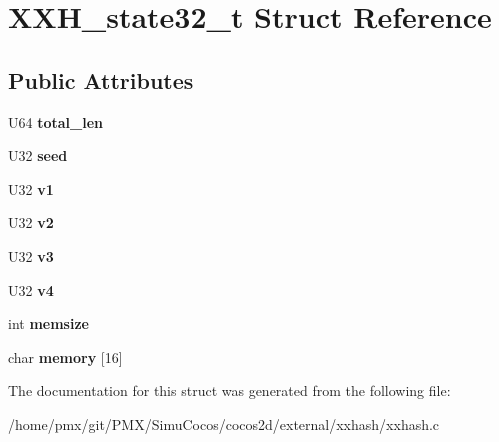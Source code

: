 \hypertarget{structXXH__state32__t}{}\section{X\+X\+H\+\_\+state32\+\_\+t Struct Reference}
\label{structXXH__state32__t}
\subsection*{Public Attributes}
\begin{DoxyCompactItemize}
\item 
\mbox{\label{structXXH__state32__t_a968184eb96ed6c2c47e77d0e7b2562e2}} 
U64 {\bfseries total\+\_\+len}
\item 
\mbox{\label{structXXH__state32__t_aa198d97d2ccb2e940e58c5676dd07b9f}} 
U32 {\bfseries seed}
\item 
\mbox{\label{structXXH__state32__t_a52d93caf96ab3cfa4d19faa232627402}} 
U32 {\bfseries v1}
\item 
\mbox{\label{structXXH__state32__t_a77ca5f7d04bf820d40c0b849e69c932b}} 
U32 {\bfseries v2}
\item 
\mbox{\label{structXXH__state32__t_a766430cd39ae981afd8a64d10329ec3d}} 
U32 {\bfseries v3}
\item 
\mbox{\label{structXXH__state32__t_a33ede79f26b162219c1475e39766148d}} 
U32 {\bfseries v4}
\item 
\mbox{\label{structXXH__state32__t_a7d511c88afd3fc22cbdff9153af8424d}} 
int {\bfseries memsize}
\item 
\mbox{\label{structXXH__state32__t_ad563091c4b74092b14e50e81141f7a0e}} 
char {\bfseries memory} \mbox{[}16\mbox{]}
\end{DoxyCompactItemize}


The documentation for this struct was generated from the following file\+:\begin{DoxyCompactItemize}
\item 
/home/pmx/git/\+P\+M\+X/\+Simu\+Cocos/cocos2d/external/xxhash/xxhash.\+c\end{DoxyCompactItemize}
